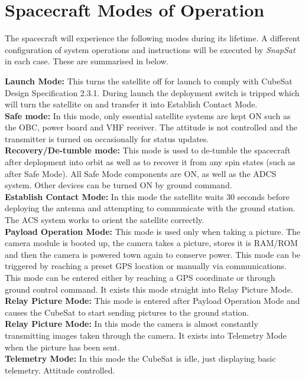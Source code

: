 \section{Spacecraft Modes of Operation}
The spacecraft will experience the following modes during its lifetime. A different configuration of system operations and instructions will be executed by \textit{SnapSat} in each case. These are summarised in below.

\noindent
\textbf{Launch Mode: } This turns the satellite off for launch to comply with CubeSat Design Specification 2.3.1. During launch the deployment switch is tripped which will turn the satellite on and transfer it into Establish Contact Mode. \\
\noindent
\textbf{Safe mode: } In this mode, only essential satellite systems are kept ON such as the OBC, power board and VHF receiver. The attitude is not controlled and the transmitter is turned on occasionally for status updates. \\ 
\noindent 
\textbf{Recovery/De-tumble mode: } This mode is used to de-tumble the spacecraft after deplopment into orbit as well as to recover it from any spin states (such as after Safe Mode). All Safe Mode components are ON, as well as the ADCS system. Other devices can be turned ON by ground command. \\
\noindent
\textbf{Establish Contact Mode: }In this mode the satellite waits 30 seconds before deploying the antenna and attempting to communicate with the ground station. The ACS system works to orient the satellite correctly. \\
\noindent
\textbf{Payload Operation Mode: } This mode is used only when taking a picture.  The camera module is booted up, the camera takes a picture, stores it is RAM/ROM and then the camera is powered town again to conserve power.  This mode can be triggered by reaching a preset GPS location or manually via communications.  This mode can be entered either by reaching a GPS coordinate or through ground control command.  It exists this mode straight into Relay Picture Mode. \\
\noindent
\textbf{Relay Picture Mode: } This mode is entered after Payload Operation Mode and causes the CubeSat to start sending pictures to the ground station. \\
\noindent
\textbf{Relay Picture Mode: } In this mode the camera is almost constantly transmitting images taken through the camera.  It exists into Telemetry Mode when the picture has been sent. \\
\noindent 
\textbf{Telemetry Mode: } In this mode the CubeSat is idle, just displaying basic telemetry.  Attitude controlled.

